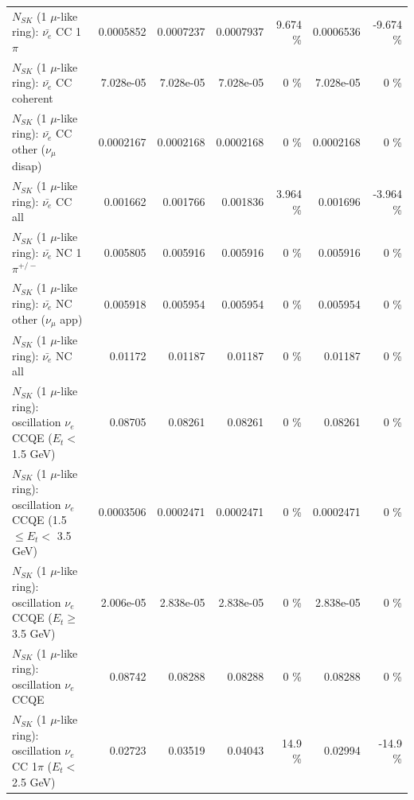\begin{table}
\begin{tabular}{| l | r | r | r  r | r  r |}
\hline
                           $N_{SK}$ (1 $\mu$-like ring): $\bar{\nu_e}$ CC 1$\pi$ &       0.0005852 &       0.0007237 &       0.0007937 &    9.674 \%  &       0.0006536 &   -9.674 \%  \\ 
                         $N_{SK}$ (1 $\mu$-like ring): $\bar{\nu_e}$ CC coherent &       7.028e-05 &       7.028e-05 &       7.028e-05 &        0 \%  &       7.028e-05 &        0 \%  \\ 
          $N_{SK}$ (1 $\mu$-like ring): $\bar{\nu_e}$ CC other ($\nu_\mu$ disap) &       0.0002167 &       0.0002168 &       0.0002168 &        0 \%  &       0.0002168 &        0 \%  \\ 
                            $N_{SK}$ (1 $\mu$-like ring): $\bar{\nu_{e}}$ CC all &        0.001662 &        0.001766 &        0.001836 &    3.964 \%  &        0.001696 &   -3.964 \%  \\ 
\hline
                     $N_{SK}$ (1 $\mu$-like ring): $\bar{\nu_e}$ NC 1$\pi^{+/-}$ &        0.005805 &        0.005916 &        0.005916 &        0 \%  &        0.005916 &        0 \%  \\ 
            $N_{SK}$ (1 $\mu$-like ring): $\bar{\nu_e}$ NC other ($\nu_\mu$ app) &        0.005918 &        0.005954 &        0.005954 &        0 \%  &        0.005954 &        0 \%  \\ 
                            $N_{SK}$ (1 $\mu$-like ring): $\bar{\nu_{e}}$ NC all &         0.01172 &         0.01187 &         0.01187 &        0 \%  &         0.01187 &        0 \%  \\ 
\hline
\hline
\hline
      $N_{SK}$ (1 $\mu$-like ring): oscillation $\nu_e$ CCQE ($E_{t} <$ 1.5 GeV) &         0.08705 &         0.08261 &         0.08261 &        0 \%  &         0.08261 &        0 \%  \\ 
$N_{SK}$ (1 $\mu$-like ring): oscillation $\nu_e$ CCQE (1.5 $\leq E_{t} <$ 3.5 GeV) &       0.0003506 &       0.0002471 &       0.0002471 &        0 \%  &       0.0002471 &        0 \%  \\ 
   $N_{SK}$ (1 $\mu$-like ring): oscillation $\nu_e$ CCQE ($E_{t} \geq$ 3.5 GeV) &       2.006e-05 &       2.838e-05 &       2.838e-05 &        0 \%  &       2.838e-05 &        0 \%  \\ 
\hline
                          $N_{SK}$ (1 $\mu$-like ring): oscillation $\nu_e$ CCQE &         0.08742 &         0.08288 &         0.08288 &        0 \%  &         0.08288 &        0 \%  \\ 
\hline
 $N_{SK}$ (1 $\mu$-like ring): oscillation $\nu_e$ CC 1$\pi$ ($E_{t} <$ 2.5 GeV) &         0.02723 &         0.03519 &         0.04043 &     14.9 \%  &         0.02994 &    -14.9 \%  \\ 

\end{tabular}
\end{table}
